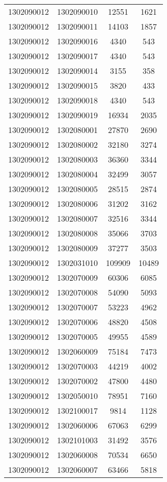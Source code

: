 \begin{longtable}[h]{llcc}
		1302090012 & 1302090010 & 12551 & 1621\\
		1302090012 & 1302090011 & 14103 & 1857\\
		1302090012 & 1302090016 & 4340 & 543\\
		1302090012 & 1302090017 & 4340 & 543\\
		1302090012 & 1302090014 & 3155 & 358\\
		1302090012 & 1302090015 & 3820 & 433\\
		1302090012 & 1302090018 & 4340 & 543\\
		1302090012 & 1302090019 & 16934 & 2035\\
		1302090012 & 1302080001 & 27870 & 2690\\
		1302090012 & 1302080002 & 32180 & 3274\\
		1302090012 & 1302080003 & 36360 & 3344\\
		1302090012 & 1302080004 & 32499 & 3057\\
		1302090012 & 1302080005 & 28515 & 2874\\
		1302090012 & 1302080006 & 31202 & 3162\\
		1302090012 & 1302080007 & 32516 & 3344\\
		1302090012 & 1302080008 & 35066 & 3703\\
		1302090012 & 1302080009 & 37277 & 3503\\
		1302090012 & 1302031010 & 109909 & 10489\\
		1302090012 & 1302070009 & 60306 & 6085\\
		1302090012 & 1302070008 & 54090 & 5093\\
		1302090012 & 1302070007 & 53223 & 4962\\
		1302090012 & 1302070006 & 48820 & 4508\\
		1302090012 & 1302070005 & 49955 & 4589\\
		1302090012 & 1302060009 & 75184 & 7473\\
		1302090012 & 1302070003 & 44219 & 4002\\
		1302090012 & 1302070002 & 47800 & 4480\\
		1302090012 & 1302050010 & 78951 & 7160\\
		1302090012 & 1302100017 & 9814 & 1128\\
		1302090012 & 1302060006 & 67063 & 6299\\
		1302090012 & 1302101003 & 31492 & 3576\\
		1302090012 & 1302060008 & 70534 & 6650\\
		1302090012 & 1302060007 & 63466 & 5818\\

\end{longtable}
